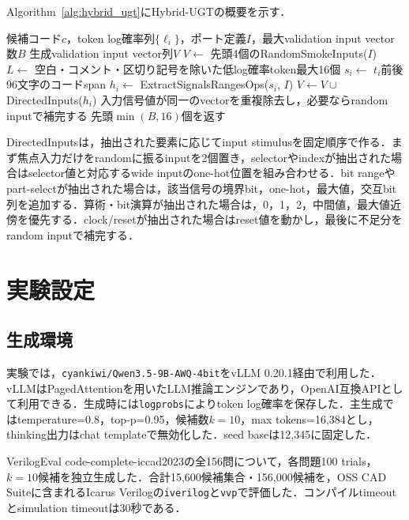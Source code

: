 \documentclass[submit,techrep,noauthor]{ipsj}
\begin{document}
Algorithm~\ref{alg:hybrid_ugt}にHybrid-UGTの概要を示す．

\begin{algorithm}[t]
\caption{Hybrid Uncertainty-Guided Testing}
\label{alg:hybrid_ugt}
\begin{algorithmic}[1]
\REQUIRE 候補コード$c$，token log確率列$\{\ell_i\}$，ポート定義$I$，最大validation input vector数$B$
\ENSURE 生成validation input vector列$V$
\STATE $V \leftarrow$ 先頭4個のRandomSmokeInputs($I$)
\STATE $L \leftarrow$ 空白・コメント・区切り記号を除いた低log確率token最大16個
  \STATE $s_i \leftarrow$ $t_i$前後96文字のコードspan
  \STATE $h_i \leftarrow$ ExtractSignalsRangesOps($s_i$, $I$)
  \STATE $V \leftarrow V \cup$ DirectedInputs($h_i$)
\ENDFOR
\STATE 入力信号値が同一のvectorを重複除去し，必要ならrandom inputで補完する
\STATE 先頭$\min(B,16)$個を返す
\end{algorithmic}
\end{algorithm}

DirectedInputsは，抽出された要素に応じてinput stimulusを固定順序で作る．まず焦点入力だけをrandomに振るinputを2個置き，selectorやindexが抽出された場合はselector値と対応するwide inputのone-hot位置を組み合わせる．bit rangeやpart-selectが抽出された場合は，該当信号の境界bit，one-hot，最大値，交互bit列を追加する．算術・bit演算が抽出された場合は，0，1，2，中間値，最大値近傍を優先する．clock/resetが抽出された場合はreset値を動かし，最後に不足分をrandom inputで補完する．

\section{実験設定}\label{sec:experiment}

\subsection{生成環境}

実験では，\texttt{cyankiwi/Qwen3.5-9B-AWQ-4bit}をvLLM 0.20.1\cite{kwon2023vllm}経由で利用した．vLLMはPagedAttentionを用いたLLM推論エンジンであり，OpenAI互換APIとして利用できる．生成時には\texttt{logprobs}によりtoken log確率を保存した．主生成ではtemperature=0.8，top-p=0.95，候補数$k=10$，max tokens=16,384とし，thinking出力はchat templateで無効化した．seed baseは12,345に固定した．

VerilogEval code-complete-iccad2023の全156問について，各問題100 trials，$k=10$候補を独立生成した．合計15,600候補集合・156,000候補を，OSS CAD Suiteに含まれるIcarus Verilogの\texttt{iverilog}と\texttt{vvp}で評価した．コンパイルtimeoutとsimulation timeoutは30秒である．
\end{document}

